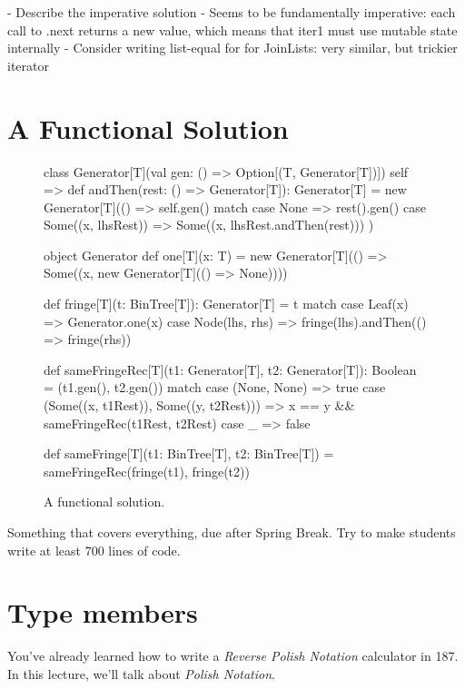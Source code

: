 \documentclass{book}
\begin{document}
- Describe the imperative solution
- Seems to be fundamentally imperative: each call to .next returns a new value,
  which means that iter1 must use mutable state internally
- Consider writing list-equal for for JoinLists: very similar, but trickier
  iterator


\section{A Functional Solution}

\begin{figure}
\begin{scalacode}
class Generator[T](val gen: () => Option[(T, Generator[T])]) { self =>
  def andThen(rest: () => Generator[T]): Generator[T] = new Generator[T](() => self.gen() match {
      case None => rest().gen()
      case Some((x, lhsRest)) => Some((x, lhsRest.andThen(rest)))
  })
}

object Generator {
  def one[T](x: T) = new Generator[T](() => Some((x, new Generator[T](() => None))))
}

def fringe[T](t: BinTree[T]): Generator[T] = t match {
  case Leaf(x) => Generator.one(x)
  case Node(lhs, rhs) => fringe(lhs).andThen(() => fringe(rhs))
}

def sameFringeRec[T](t1: Generator[T], t2: Generator[T]): Boolean = (t1.gen(), t2.gen()) match {
  case (None, None) => true
  case (Some((x, t1Rest)), Some((y, t2Rest))) => x == y && sameFringeRec(t1Rest, t2Rest)
  case _ => false
}

def sameFringe[T](t1: BinTree[T], t2: BinTree[T]) = sameFringeRec(fringe(t1), fringe(t2))
\end{scalacode}
\caption{A functional solution.}
\label{sameFringeFun}
\end{figure}



\newlecture


Something that covers everything, due after Spring Break. Try to make students
write at least 700 lines of code.

\newlecture

\newlecture

\section{Type members}

You've already learned how to write a \emph{Reverse Polish Notation} calculator
in 187. In this lecture, we'll talk about \emph{Polish Notation}.
\end{document}
